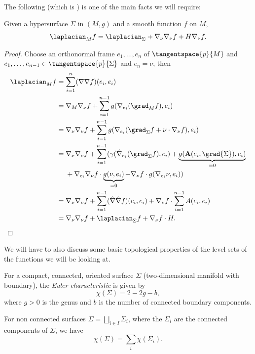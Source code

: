 \documentclass[titlepage,numbers=noenddot,headinclude,oneside,%
footinclude=true,cleardoublepage=empty,%
BCOR=5mm,paper=a4,fontsize=11pt,%
english,%
]{scrartcl}
\begin{document}
{The following (which is \cite[Exercise 2.3 in][]{leeGeometricRelativity2019}) is one of the main facts we will require:
\begin{fact}\label{fact:laplacian_and_hypersurface_laplacian}
    Given a hypersurface \( \Sigma \) in \( (M,g) \) and a smooth function \( f \) on \( M \),
    \begin{equation*}
        \laplacian_M f=\laplacian_\Sigma +\Mconnection_\nu\Mconnection_\nu f+H \Mconnection_\nu f.
    \end{equation*}
\end{fact}
\begin{proof}
    Choose an orthonormal frame \( e_1,\dotsc,e_n \) of \( \tangentspace{p}{M} \) and \( e_1,\dotsc,e_{n-1}\in \tangentspace{p}{\Sigma} \) and \( e_n=\nu \), then
    \begin{align*}
        \laplacian_M f&=\sum_{i=1}^{n}(\Mconnection\Mconnection f)(e_i,e_i)\\
        &=\Mconnection_M \Mconnection_\nu f+\sum_{i=1}^{n-1}g(\Mconnection_{e_i} (\grad_M f),e_i)\\
        &=\Mconnection_\nu \Mconnection_\nu f+\sum_{i=1}^{n-1}g(\Mconnection_{e_i}(\grad_{\Sigma}f+\nu\cdot \Mconnection_\nu f),e_i)\\
        &=\begin{aligned}[t]
            &\Mconnection_\nu \Mconnection_\nu f+\sum_{i=1}^{n-1}(\gamma(\Sigmaconnection_{e_i}(\grad_{\Sigma} f),e_i)+\underbrace{g(\mathbf{A}(e_i,\grad{\Sigma}),e_i)}_{=0}\\
            &+\Mconnection_{
        e_i}\Mconnection_{\nu}f\cdot \underbrace{g(\nu,e_i)}_{=0}+\Mconnection_{\nu}f\cdot g(\Mconnection_{e_i}\nu,e_i))
        \end{aligned}\\
        &=\Mconnection_\nu \Mconnection_\nu f+\sum_{i=1}^{n-1}(\Sigmaconnection\Sigmaconnection f)(e_i,e_i)+\Mconnection_\nu f\cdot \sum_{i=1}^{n-1}A(e_i,e_i)\\
        &=\Mconnection_\nu \Mconnection_\nu f+\laplacian_{\Sigma}f+\Mconnection_{\nu}f\cdot H.
    \end{align*}
\end{proof}
}
We will have to also discuss some basic topological properties of the level sets of the functions we will be looking at.
\begin{definition}
    For a compact, connected, oriented surface \( \Sigma \) (two-dimensional manifold with boundary), the \emph{Euler characteristic} is given by
    \begin{equation}
        \chi(\Sigma)=2-2g-b,\label{eq:def_euler_characteristic}
    \end{equation}
    where \( g>0 \) is the genus and \( b \) is the number of connected boundary components.

    For non connected surfaces \( \Sigma=\bigsqcup_{i\in I} \Sigma_i \), where the \( \Sigma_i \) are the connected components of \( \Sigma \), we have
    \begin{equation*}
        \chi(\Sigma)=\sum_{i}\chi(\Sigma_i).
    \end{equation*}
\end{definition}
\end{document}
